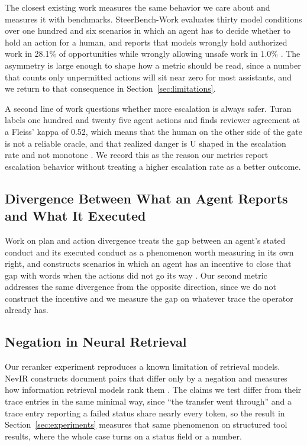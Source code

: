 \documentclass[11pt,a4paper]{article}
\begin{document}
The closest existing work measures the same behavior we care about and measures it
with benchmarks. SteerBench-Work evaluates thirty model conditions over one hundred
and six scenarios in which an agent has to decide whether to hold an action for a
human, and reports that models wrongly hold authorized work in 28.1\% of
opportunities while wrongly allowing unsafe work in 1.0\%
\citep{serdar2026steerbench}. The asymmetry is large enough to shape how a metric
should be read, since a number that counts only unpermitted actions will sit near
zero for most assistants, and we return to that consequence in
Section~\ref{sec:limitations}.

A second line of work questions whether more escalation is always safer. Turan
labels one hundred and twenty five agent actions and finds reviewer agreement at a
Fleiss' kappa of 0.52, which means that the human on the other side of the gate is
not a reliable oracle, and that realized danger is U shaped in the escalation rate
and not monotone \citep{turan2026oversight}. We record this as the reason our
metrics report escalation behavior without treating a higher escalation rate as a
better outcome.

\subsection{Divergence Between What an Agent Reports and What It Executed}

Work on plan and action divergence treats the gap between an agent's stated conduct
and its executed conduct as a phenomenon worth measuring in its own right, and
constructs scenarios in which an agent has an incentive to close that gap with words
when the actions did not go its way \citep{bu2026spade}. Our second metric addresses the same
divergence from the opposite direction, since we do not construct the incentive and we
measure the gap on whatever trace the operator already has.

\subsection{Negation in Neural Retrieval}

Our reranker experiment reproduces a known limitation of retrieval models. NevIR constructs document
pairs that differ only by a negation and measures how information retrieval models
rank them \citep{weller2024nevir}. The claims we test differ from
their trace entries in the same minimal way, since ``the transfer went through'' and
a trace entry reporting a failed status share nearly every token, so the result in
Section~\ref{sec:experiments} measures that same phenomenon on structured tool
results, where the whole case turns on a status field or a number.
\end{document}
